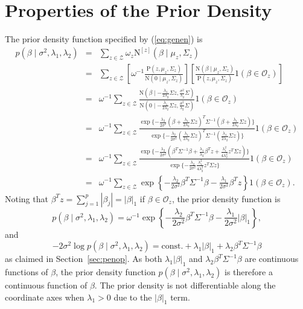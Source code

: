 \documentclass[12pt]{article}
\begin{document}
\appendix
\section{Properties of the Prior Density}\label{app:densprop}
The prior density function specified by (\ref{eq:genen}) is
\begin{eqnarray*}
	p(\beta \mid \sigma^2, \lambda_1, \lambda_2) &=& 
		\sum_{z \in \mathcal{Z}} \omega_z \mbox{N}^{[z]}(\beta \mid \mu_z, \Sigma_z) \\
	&=& \sum_{z \in \mathcal{Z}} \left[\omega^{-1} \frac{\mbox{P}(z, \mu_z, \Sigma_z)}
		{\mbox{N}(0 \mid \mu_z, \Sigma_z)}\right]
		\left[ \frac{\mbox{N}(\beta \mid \mu_z, \Sigma_z)}{\mbox{P}(z, \mu_z, \Sigma_z)}
		1(\beta \in \mathcal{O}_z)\right] \\
	&=& \omega^{-1} \sum_{z \in \mathcal{Z}} \frac{\mbox{N}\left(\beta \mid -\frac{\lambda_1}{2\lambda_2}
		\Sigma z, \frac{\sigma^2}{\lambda_2}\Sigma\right)}
		{\mbox{N}\left(0 \mid -\frac{\lambda_1}{2\lambda_2}\Sigma z, \frac{\sigma^2}{\lambda_2}\Sigma\right)}
		1(\beta \in \mathcal{O}_z) \\
	&=& \omega^{-1} \sum_{z \in \mathcal{Z}} \frac{\exp\{ -\frac{\lambda_2}{2\sigma^2}
		(\beta + \frac{\lambda_1}{2\lambda_2}\Sigma z)^T \Sigma^{-1} 
		(\beta + \frac{\lambda_1}{2\lambda_2}\Sigma z)\}}
		{\exp\{-\frac{\lambda_2}{2\sigma^2}(\frac{\lambda_1}{2\lambda_2}\Sigma z)^T \Sigma^{-1} 
			(\frac{\lambda_1}{2\lambda_2}\Sigma z)\}} 1(\beta \in \mathcal{O}_z) \\
	&=& \omega^{-1} \sum_{z \in \mathcal{Z}} \frac{\exp\{ -\frac{\lambda_2}{2\sigma^2}(
		\beta^T \Sigma^{-1}\beta + \frac{\lambda_1}{\lambda_2} \beta^T z + \frac{\lambda_1^2}
			{4\lambda_2^2}z^T \Sigma z )\}}{\exp\{-\frac{\lambda_2}{2\sigma^2}
			\frac{\lambda_1^2}{4\lambda_2^2} z^T \Sigma z  \}} 1(\beta \in \mathcal{O}_z) \\
	&=& \omega^{-1} \sum_{z \in \mathcal{Z}} \exp\left\{ -\frac{\lambda_2}{2 \sigma^2}\beta^T \Sigma^{-1}
			\beta - \frac{\lambda_1}{2\sigma^2}\beta^T z \right\} 1(\beta \in \mathcal{O}_z).
\end{eqnarray*}
Noting that $\beta^T z = \sum_{j=1}^p |\beta_j| = |\beta|_1$ if $\beta \in \mathcal{O}_z$, the prior density
function is
\[
	p(\beta \mid \sigma^2, \lambda_1, \lambda_2) = \omega^{-1} \exp\left\{ - \frac{\lambda_2}{2\sigma^2}
		\beta^T \Sigma^{-1} \beta - \frac{\lambda_1}{2\sigma^2} |\beta|_1 \right\},
\]
and
\[
	-2\sigma^2 \log p(\beta \mid \sigma^2, \lambda_1, \lambda_2) = 
		\mbox{const.} + \lambda_1 | \beta |_1+ 
		\lambda_2 \beta^T \Sigma^{-1} \beta
\]
as claimed in Section~\ref{sec:penop}.  As both $\lambda_1 |\beta|_1$ and $\lambda_2 \beta^T \Sigma^{-1}
\beta$ are continuous functions of $\beta$, the prior density function $p(\beta \mid \sigma^2, \lambda_1,
\lambda_2)$ is therefore a continuous function of $\beta$. The prior density is not differentiable along the
coordinate axes when $\lambda_1 > 0$ due to the $|\beta|_1$ term.
\end{document}
